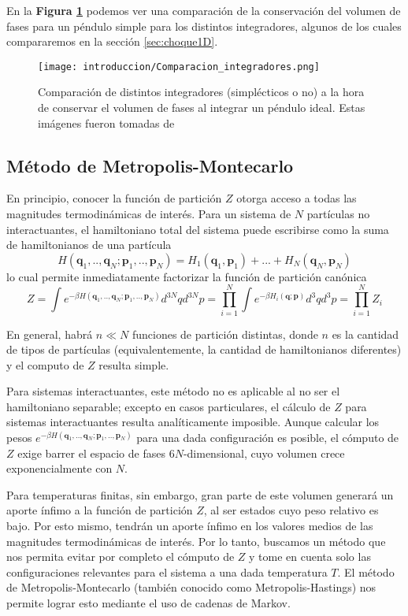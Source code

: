 En la \textbf{Figura \ref{fig:comp_integ_gatito}} podemos ver una comparación de la conservación del volumen de fases para un péndulo simple para los distintos integradores, algunos de los cuales compararemos en la sección \ref{sec:choque1D}.

\begin{figure}[H]
	\centering	%
	\texttt{[image: introduccion/Comparacion\_integradores.png]}
	\caption{Comparación de distintos integradores (simplécticos o no) a la hora de conservar el volumen de fases al integrar un péndulo ideal.
		Estas imágenes fueron tomadas de \cite[pp. 188]{BOOK:SPR_INT}}
	\label{fig:comp_integ_gatito}
\end{figure}

\subsection{Método de Metropolis-Montecarlo}

En principio, conocer la función de partición $Z$ otorga acceso a todas las magnitudes termodinámicas de interés.
Para un sistema de $N$ partículas no interactuantes, el hamiltoniano total del sistema puede escribirse como la suma de hamiltonianos de una partícula
\[H(\mathbf{q}_1,..,\mathbf{q}_N;\mathbf{p}_1,..,\mathbf{p}_N) = H_1(\mathbf{q}_1, \mathbf{p}_1) + ... +H_N(\mathbf{q}_N, \mathbf{p}_N)\]
lo cual permite inmediatamente factorizar la función de partición canónica
\[ Z = \int e^{-\beta H(\mathbf{q}_1,..,\mathbf{q}_N;\mathbf{p}_1,..,\mathbf{p}_N)} d^{3N}qd^{3N}p = \prod_{i=1}^N \int e^{-\beta H_i(\mathbf{q};\mathbf{p})} d^{3}qd^{3}p = \prod_{i=1}^N Z_i \]

En general, habrá $n\ll N$ funciones de partición distintas, donde $n$ es la cantidad de tipos de partículas (equivalentemente, la cantidad de hamiltonianos diferentes) y el computo de $Z$ resulta simple.

Para sistemas interactuantes, este método no es aplicable al no ser el hamiltoniano separable; excepto en casos particulares, el cálculo de $Z$ para sistemas interactuantes resulta analíticamente imposible.
Aunque calcular los pesos $e^{-\beta H(\mathbf{q}_1,..,\mathbf{q}_N;\mathbf{p}_1,..,\mathbf{p}_N)}$ para una dada configuración es posible, el cómputo de $Z$ exige barrer el espacio de fases $6N$-dimensional,
cuyo volumen crece exponencialmente con $N$.

Para temperaturas finitas, sin embargo, gran parte de este volumen generará un aporte ínfimo a la función de partición $Z$, al ser estados cuyo peso relativo es bajo.
Por esto mismo, tendrán un aporte ínfimo en los valores medios de las magnitudes termodinámicas de interés.
Por lo tanto, buscamos un método que nos permita evitar por completo el cómputo de $Z$ y tome en cuenta solo las configuraciones relevantes para el sistema a una dada temperatura $T$.
El método de Metropolis-Montecarlo (también conocido como Metropolis-Hastings\cite{Metropolis1953}) nos permite lograr esto mediante el uso de cadenas de Markov.

